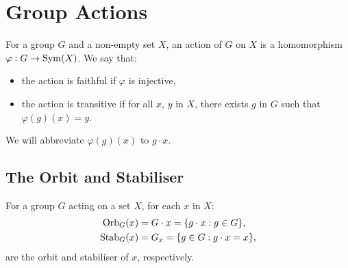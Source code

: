 \section{Group Actions}

For a group $G$ and a non-empty set $X$, an action of $G$ on $X$ is
a homomorphism $\varphi : G \to \operatorname{Sym}(X)$. We say that: \begin{itemize}
    \item the action is faithful if $\varphi$ is injective,
    \item the action is transitive if for all $x$, $y$ in $X$,
        there exists $g$ in $G$ such that $\varphi(g)(x) = y$.
\end{itemize} We will abbreviate $\varphi(g)(x)$ to $g \cdot x$.

\subsection{The Orbit and Stabiliser}

For a group $G$ acting on a set $X$, for each $x$ in $X$: \begin{align*}
    \operatorname{Orb}_G(x)  &= G \cdot x = \{g \cdot x : g \in G\}, \\
    \operatorname{Stab}_G(x) &= G_x = \{g \in G : g \cdot x = x\},
\end{align*} are the orbit and stabiliser of $x$, respectively.
